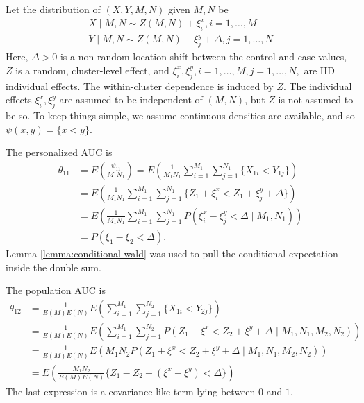 \documentclass[12pt]{article}
\DeclareMathOperator{\AUC}{AUC}
\newcommand{\E}{E}
\renewcommand{\P}{P}
\newcommand{\cind}{\perp \!\!\! \perp}
\newcommand{\aucindiv}{\theta_{11}}%
\newcommand{\aucpop}{\theta_{12}}%
\newcommand{\kernel}{\psi}
\newcommand{\Kernel}{\psi}
\begin{document}
Let the distribution of $(X,Y,M,N)$ given $M,N$ be
\begin{align}
  X \mid M,N \sim Z(M,N) + \xi_i^x, i=1,\ldots,M\\
  Y \mid M,N \sim Z(M,N) + \xi_j^y + \Delta, j=1,\ldots,N
  \label{model:random effects}
\end{align}
Here, $\Delta>0$ is a non-random location shift between the control and
case values, $Z$ is a random, cluster-level effect, and
$\xi_i^x, \xi_j^y,i=1,\ldots,M,j=1,\ldots,N,$ are IID
individual effects. The within-cluster dependence is induced by
$Z$. The individual effects $\xi_i^x, \xi_j^y$ are assumed to be
independent of $(M,N)$, but $Z$ is not assumed to be so. To keep
things simple, we assume continuous densities are available, and so
$\kernel(x,y)=\{x<y\}$.%

The personalized AUC is
\begin{align}
  \aucindiv &= \E\left(\frac{\Kernel_{11}}{M_1N_1}\right)
          = \E \left(\frac{1}{M_1N_1} \sum_{i=1}^{M_1}\sum_{j=1}^{N_1}\{X_{1i}<Y_{1j}\}\right)\\
          &= \E\left( \frac{1}{M_1N_1} \sum_{i=1}^{M_1}\sum_{j=1}^{N_1}\{Z_1+\xi^x_i<Z_1+\xi_j^y+\Delta\}\right)\\
          &= \E \left(\frac{1}{M_1N_1} \sum_{i=1}^{M_1}\sum_{j=1}^{N_1}
            \P(\xi_i^x-\xi_j^y<\Delta\mid M_1,N_1)\right)\\
          &=\P(\xi_1 - \xi_2 < \Delta).\label{eqn:examples:aucindiv}
\end{align}
Lemma \ref{lemma:conditional wald} was used to pull the conditional expectation inside
the double sum.

The population AUC is
\begin{align}
  \aucpop &= \frac{1}{\E(M)\E(N)}\E\left( \sum_{i=1}^{M_1}\sum_{j=1}^{N_2}\{X_{1i}<Y_{2j}\}\right)\\
          &=\frac{1}{\E(M)\E(N)}\E \left(\sum_{i=1}^{M_1}\sum_{j=1}^{N_2}
            \P(Z_1 + \xi^x < Z_2 + \xi^y + \Delta \mid M_1,N_1,M_2,N_2)\right)\\
          &=\frac{1}{\E(M)\E(N)}\E \left(M_1N_2
            \P(Z_1 + \xi^x < Z_2 + \xi^y + \Delta \mid M_1,N_1,M_2,N_2)\right)\\
          &=\E\left(\frac{M_1N_2}{\E(M)\E(N)} \{Z_1-Z_2 + (\xi^x-\xi^y)<\Delta\} \right)\label{eqn:examples:aucpop}
\end{align}
The last expression is a covariance-like term lying between $0$ and $1$.
\end{document}
